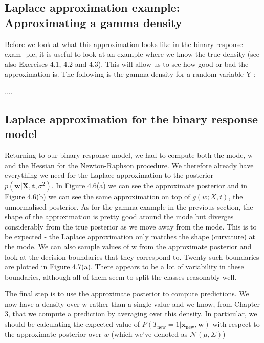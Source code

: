 \subsection{Laplace approximation example: Approximating a gamma density}

Before we look at what this approximation looks like in the binary response exam-
ple, it is useful to look at an example where we know the true density (see also
Exercises 4.1, 4.2 and 4.3). This will allow us to
see how good or bad the approximation is. The following is the gamma density for
a random variable Y :

....

\subsection{Laplace approximation for the binary response model}

Returning to our binary response model, we had to compute both the mode, w
and the Hessian for the Newton-Raphson procedure. We therefore already have
everything we need for the Laplace approximation to the posterior
$p(\mathbf{w} | \mathbf{X}, \mathbf{t}, \sigma^2)$.
In Figure 4.6(a) we can see the approximate posterior and in Figure 4.6(b) we can
see the same approximation on top of $g(w; X, t)$, the unnormalised posterior. As
for the gamma example in the previous section, the shape of the approximation is
pretty good around the mode but diverges considerably from the true posterior as we
move away from the mode. This is to be expected - the Laplace approximation only
matches the shape (curvature) at the mode. We can also sample values of w from
the approximate posterior and look at the decision boundaries that they correspond
to. Twenty such boundaries are plotted in Figure 4.7(a). There appears to be a
lot of variability in these boundaries, although all of them seem to split the classes
reasonably well.

The final step is to use the approximate posterior to compute predictions. We
now have a density over w rather than a single value and we know,
from Chapter 3, that we compute a prediction by averaging over this density.
In particular, we should be calculating the expected value of
$P(T_{\mathrm{new}} = 1| \mathbf{x}_{\mathrm{new}}, \mathbf{w})$ with respect to the
approximate posterior over $w$ (which we've denoted as
$\mathcal{N}(\mu,\Sigma)$)

